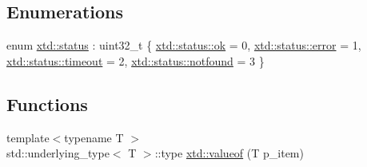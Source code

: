 \subsection*{Enumerations}
\begin{DoxyCompactItemize}
\item 
enum \hyperlink{namespacextd_a68ed4fe8e9c11116b68efe5b102aec50}{xtd\+::status} \+: uint32\+\_\+t \{ \hyperlink{namespacextd_a68ed4fe8e9c11116b68efe5b102aec50a444bcb3a3fcf8389296c49467f27e1d6}{xtd\+::status\+::ok} = 0, 
\hyperlink{namespacextd_a68ed4fe8e9c11116b68efe5b102aec50acb5e100e5a9a3e7f6d1fd97512215282}{xtd\+::status\+::error} = 1, 
\hyperlink{namespacextd_a68ed4fe8e9c11116b68efe5b102aec50a90272dda245ae1fb3cf197e91a8689dc}{xtd\+::status\+::timeout} = 2, 
\hyperlink{namespacextd_a68ed4fe8e9c11116b68efe5b102aec50ac2adf6ecc220f2711801d6e466340183}{xtd\+::status\+::notfound} = 3
 \}
\end{DoxyCompactItemize}
\subsection*{Functions}
\begin{DoxyCompactItemize}
\item 
{\footnotesize template$<$typename T $>$ }\\std\+::underlying\+\_\+type$<$ T $>$\+::type \hyperlink{namespacextd_a518b0ddcbf87f6c21175d2760f4fbe21}{xtd\+::valueof} (T p\+\_\+item)
\end{DoxyCompactItemize}
